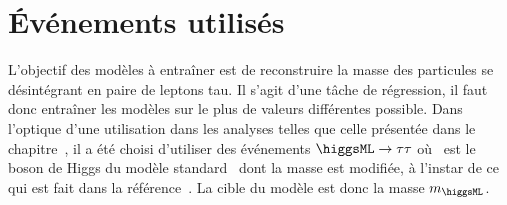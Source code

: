 \section{Événements utilisés}\label{chapter-ML-section-evt_gen}
L'objectif des modèles à entraîner est de reconstruire la masse des particules se désintégrant en paire de leptons tau.
Il s'agit d'une tâche de régression, il faut donc entraîner les modèles sur le plus de valeurs différentes possible.
Dans l'optique d'une utilisation dans les analyses telles que celle présentée dans le chapitre~,
il a été choisi d'utiliser des événements
$\higgsML\to\tau\tau$
où \higgsML\ est le boson de Higgs du modèle standard \higgs\ dont la masse est modifiée,
à l'instar de ce qui est fait dans la référence~\cite{BARTSCHI201929}.
La cible du modèle est donc la masse $m_{\higgsML}$.
